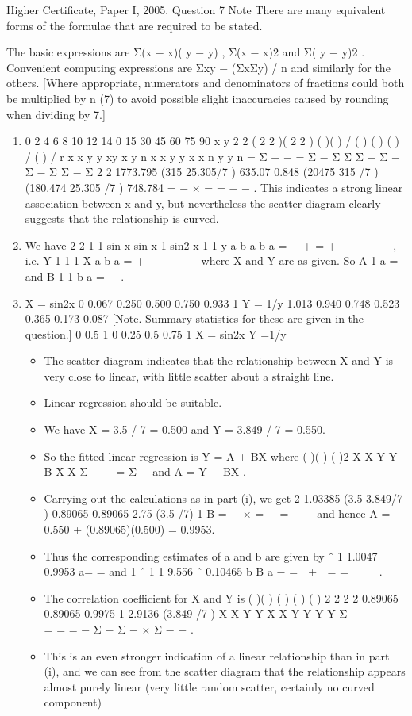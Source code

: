 \documentclass[a4paper,12pt]{article}
\begin{document}
Higher Certificate, Paper I, 2005. Question 7
Note There are many equivalent forms of the formulae that are required to be stated.


The basic expressions are Σ(x − x)( y − y) , Σ(x − x)2 and Σ( y − y)2 . Convenient
computing expressions are Σxy − (ΣxΣy) / n and similarly for the others. [Where
appropriate, numerators and denominators of fractions could both be multiplied by n
(7) to avoid possible slight inaccuracies caused by rounding when dividing by 7.]
\begin{enumerate}
\item 
0
2
4
6
8
10
12
14
0 15 30 45 60 75 90
x
y
2 2 ( 2 2 )( 2 2 )
( )( ) /
( ) ( ) ( ) / ( ) /
r x x y y xy x y n
x x y y x x n y y n
= Σ − − = Σ − Σ Σ
Σ − Σ − Σ − Σ Σ − Σ
2 2
1773.795 (315 25.305/7 ) 635.07 0.848
(20475 315 /7 )(180.474 25.305 /7 ) 748.784
= − × = =
− −
.
This indicates a strong linear association between x and y, but nevertheless the scatter
diagram clearly suggests that the relationship is curved.
\item 
We have
2 2
1 1 sin x sin x 1 sin2 x 1 1
y a b a b a
= − + = +  −   
 
, i.e. Y 1 1 1 X
a b a
= +  −   
 
where
X and Y are as given.
So A 1
a
= and B 1 1
b a
= − .

\item 
X = sin2x 0 0.067 0.250 0.500 0.750 0.933 1
Y = 1/y 1.013 0.940 0.748 0.523 0.365 0.173 0.087
[Note. Summary statistics for these are given in the question.]
0
0.5
1
0 0.25 0.5 0.75 1
X = sin2x
Y
=1/y
\begin{itemize}
\item 
The scatter diagram indicates that the relationship between X and Y is very close to
linear, with little scatter about a straight line. 
\item Linear regression should be suitable.
\item  We have X = 3.5 / 7 = 0.500 and Y = 3.849 / 7 = 0.550.
\item  So the fitted linear regression is Y = A + BX where ( )( )
( )2
X X Y Y
B
X X
Σ − −
=
Σ −
and
A = Y − BX .
\item  Carrying out the calculations as in part (i), we get
2
1.03385 (3.5 3.849/7 ) 0.89065 0.89065
2.75 (3.5 /7) 1
B = − × = − = −
−
and hence A = 0.550 + (0.89065)(0.500) = 0.9953.
\item Thus the corresponding estimates of a and b are given by ˆ 1 1.0047
0.9953
a= = and
1 ˆ 1 1 9.556
ˆ 0.10465
b B
a
− =  +  = =  
 
.
\item The correlation coefficient for X and Y is
( )( )
( ) ( ) ( ) 2 2 2 2
0.89065 0.89065 0.9975
1 2.9136 (3.849 /7 )
X X Y Y
X X Y Y Y Y
Σ − − − − = = = −
Σ − Σ − × Σ − −
.
\item This is an even stronger indication of a linear relationship than in part (i), and we can
see from the scatter diagram that the relationship appears almost purely linear (very
little random scatter, certainly no curved component)
\end{itemize}

\end{enumerate}
\end{document}

